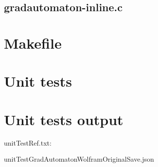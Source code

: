 \begin{scriptsize}
\begin{ttfamily}

\end{ttfamily}
\end{scriptsize}

\subsection{gradautomaton-inline.c}

\begin{scriptsize}
\begin{ttfamily}

\end{ttfamily}
\end{scriptsize}

\section{Makefile}

\begin{scriptsize}
\begin{ttfamily}

\end{ttfamily}
\end{scriptsize}

\section{Unit tests}

\begin{scriptsize}
\begin{ttfamily}

\end{ttfamily}
\end{scriptsize}

\section{Unit tests output}

unitTestRef.txt:
\begin{scriptsize}
\begin{ttfamily}

\end{ttfamily}
\end{scriptsize}

unitTestGradAutomatonWolframOriginalSave.json
\begin{scriptsize}
\begin{ttfamily}

\end{ttfamily}
\end{scriptsize}




